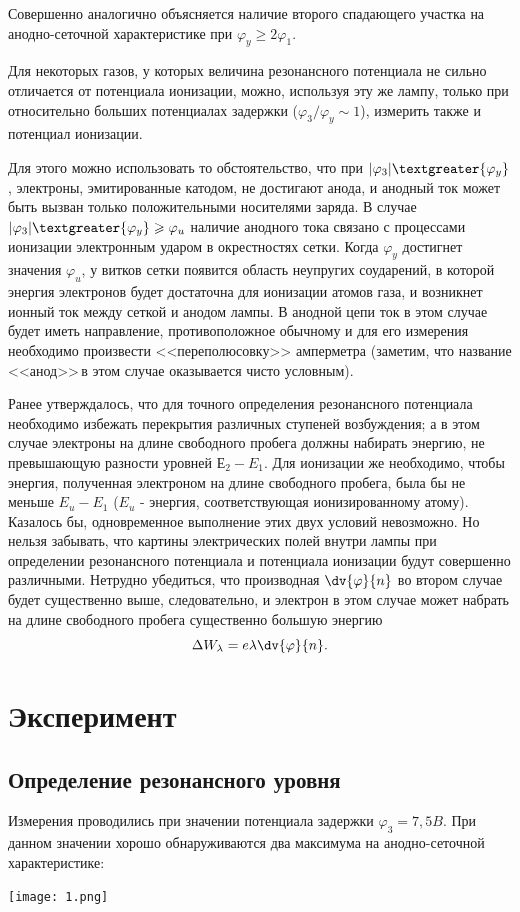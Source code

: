 Совершенно аналогично объясняется наличие второго спадающего участка на анодно-сеточной характеристике при $\varphi_{y}\geqslant2\varphi_{1}$.

Для некоторых газов, у которых величина резонансного потенциала не сильно отличается от потенциала ионизации, можно, используя эту же лампу, только при относительно больших потенциалах задержки ($\varphi_{3} /\varphi_{y} \sim1$), измерить также и потенциал ионизации.

Для этого можно использовать то обстоятельство, что при $|\varphi_{3}|\textgreater{\varphi_{y}}$, электроны, эмитированные катодом, не достигают анода, и анодный ток может быть вызван только положительными носителями заряда. В случае $|\varphi_{3}|\textgreater{\varphi_{y}}\geqslant{\varphi_{u}}$ наличие анодного тока связано с процессами ионизации электронным ударом в окрестностях сетки. Когда $\varphi_{y}$ достигнет значения $\varphi_{u}$, у витков сетки появится область неупругих соударений, в которой энергия электронов будет достаточна для ионизации атомов газа, и возникнет ионный ток между сеткой и анодом лампы. В анодной цепи ток в этом случае будет иметь направление, противоположное обычному и для его измерения необходимо произвести <<переполюсовку>> амперметра (заметим, что название <<анод>>\,в этом случае оказывается чисто условным).

Ранее утверждалось, что для точного определения резонансного потенциала необходимо избежать перекрытия различных ступеней возбуждения; а в этом случае электроны на длине свободного пробега должны набирать энергию, не превышающую разности уровней $\text{Е}_{2}-E_{1}$. Для ионизации же необходимо, чтобы энергия, полученная электроном на длине свободного пробега, была бы не меньше $E_{u}-E_1$ ($E_{u}$ - энергия, соответствующая ионизированному атому). Казалось бы, одновременное выполнение этих двух условий невозможно. Но нельзя забывать, что картины электрических полей внутри лампы при определении резонансного потенциала и потенциала ионизации будут совершенно различными. Нетрудно убедиться, что производная $\displaystyle\dv{\varphi}{n}$ во втором случае будет существенно выше, следовательно, и электрон в этом случае может набрать на длине свободного пробега существенно большую энергию $$\Delta W_{\lambda}=e\lambda \displaystyle\dv{\varphi}{n}.$$

\section{Эксперимент}
\subsection{Определение резонансного уровня}
Измерения проводились при значении потенциала задержки $\varphi_{3}=7,5 B$. При данном значении хорошо обнаруживаются два максимума на анодно-сеточной характеристике: 
\begin{minipage}{0.8\linewidth}
        \texttt{[image: 1.png]} 
\end{minipage}

